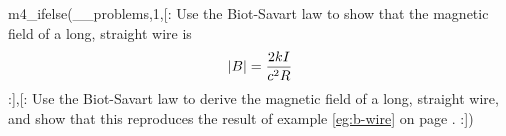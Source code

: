 m4_ifelse(__problems,1,[:%
        Use the Biot-Savart law to show that the magnetic field of a long, straight wire
        is 
        \begin{equation*}
                | B| = \frac{2 kI}{ c^2 R}\\
        \end{equation*}
:],[:%
        Use the Biot-Savart law to derive the magnetic field of a long, straight wire,
        and show that this reproduces the result of example \ref{eg:b-wire} on page \pageref{eg:b-wire}.
:])
